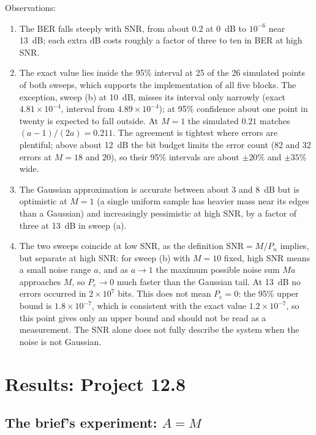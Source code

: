 \documentclass[11pt,a4paper]{article}
\newcommand{\snr}{\mathrm{SNR}}
\begin{document}
Observations:
\begin{enumerate}
  \item The BER falls steeply with SNR, from about $0.2$ at \SI{0}{dB} to
        $10^{-6}$ near \SI{13}{dB}; each extra dB costs roughly a factor of three
        to ten in BER at high SNR.
  \item The exact value lies inside the 95\% interval at 25 of the 26 simulated
        points of both sweeps, which supports the implementation of all five blocks.
        The exception, sweep (b) at \SI{10}{dB}, misses its interval only narrowly
        (exact $4.81\times10^{-4}$, interval from $4.89\times10^{-4}$); at 95\%
        confidence about one point in twenty is expected to fall outside. At $M=1$
        the simulated $0.21$ matches $(a-1)/(2a)=0.211$. The agreement is tightest
        where errors are plentiful; above about \SI{12}{dB} the bit budget limits the
        error count (82 and 32 errors at $M=18$ and $20$), so their 95\% intervals are
        about $\pm20\%$ and $\pm35\%$ wide.
  \item The Gaussian approximation is accurate between about 3 and \SI{8}{dB} but
        is optimistic at $M=1$ (a single uniform sample has heavier mass near its
        edges than a Gaussian) and increasingly pessimistic at high SNR, by a factor
        of three at \SI{13}{dB} in sweep (a).
  \item The two sweeps coincide at low SNR, as the definition $\snr=M/P_n$ implies,
        but separate at high SNR: for sweep (b) with $M=10$ fixed, high SNR means a
        small noise range $a$, and as $a\to1$ the maximum possible noise sum $Ma$
        approaches $M$, so $P_e\to0$ much faster than the Gaussian tail. At
        \SI{13}{dB} no errors occurred in $2\times10^7$ bits. This does not mean
        $P_e=0$: the 95\% upper bound is $1.8\times10^{-7}$, which is consistent
        with the exact value $1.2\times10^{-7}$, so this point gives only an upper
        bound and should not be read as a measurement. The SNR alone does not fully describe the
        system when the noise is not Gaussian.
\end{enumerate}

\section{Results: Project 12.8}\label{sec:res128}

\subsection{The brief's experiment: \texorpdfstring{$A=M$}{A = M}}
\end{document}
